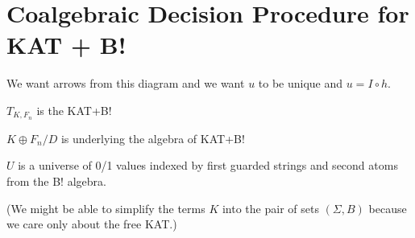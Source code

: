 \documentclass{article}
\newcommand{\atoms}{\textsf{\small{At}}}
\newcommand{\actions}{\Sigma}
\newcommand{\terms}{T_{K,F_n}}
\newcommand{\coproduct}{K \oplus F_n / D}
\begin{document}
\section*{Coalgebraic Decision Procedure for KAT + B!}





  We want arrows from this diagram and we want $u$ to be unique and $u = I \circ h$.
  \begin{center}
  \end{center}
  
  $\terms$ is the KAT+B!
  
  $\coproduct$ is underlying the algebra of KAT+B!
  

  $U$ is a universe of 0/1 values indexed by first guarded strings and second atoms from the B! algebra.

  (We might be able to simplify the terms $K$ into the pair of sets $(\Sigma,B)$ because we care only about the free KAT.)
\end{document}
